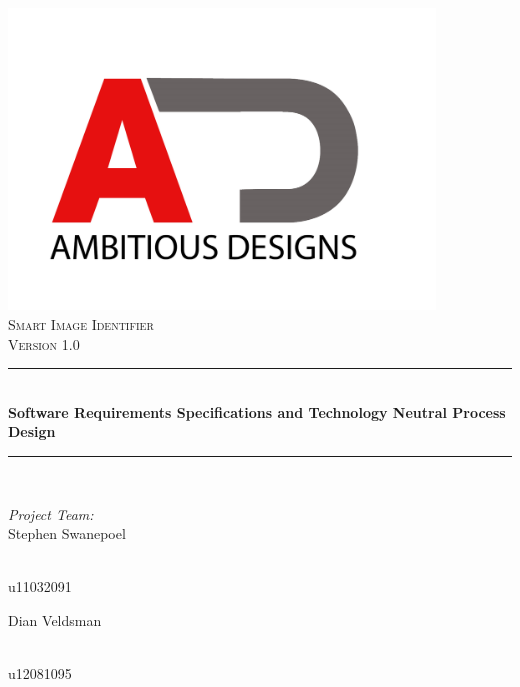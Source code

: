 \documentclass[a4paper,12pt]{report}
\newcommand{\HRule}{\rule{\linewidth}{0.5mm}}
\begin{document}
\begin{titlepage}
\begin{center}
\includegraphics[height=8cm]{../Images/ad.jpg}\\
\textsc{\Large Smart Image Identifier }\\[1.0cm]
\textsc{\Large Version 1.0 }\\[0.5cm]
\HRule \\[0.4cm]
{ \huge \bfseries Software Requirements Specifications and Technology Neutral Process Design}\\[0.4cm]
\HRule \\[0.4cm]
\begin{minipage}{0.4\textwidth}
\begin{flushleft} \large
\emph{Project Team:}\\
Stephen {Swanepoel}
\end{flushleft}
\end{minipage}
\begin{minipage}{0.4\textwidth}
\begin{flushright} \large
\emph{} \\
u11032091
\end{flushright}
\end{minipage}
\begin{minipage}{0.4\textwidth}
\begin{flushleft} \large
Dian {Veldsman}
\end{flushleft}
\end{minipage}
\begin{minipage}{0.4\textwidth}
\begin{flushright} \large
\emph{} \\
u12081095
\end{flushright}
\end{minipage}

\end{center}
\end{titlepage}
\footnotesize
\normalsize
\end{document}
